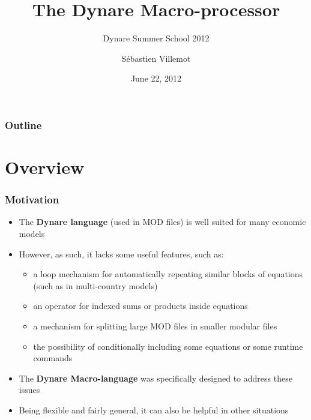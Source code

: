 \documentclass{beamer}
\title{The Dynare Macro-processor}
\subtitle{Dynare Summer School 2012}
\author{Sébastien Villemot}
\institute{CEPREMAP}
\date{June 22, 2012}
\begin{document}
\begin{frame}
  \titlepage
\end{frame}

\begin{frame}
  \frametitle{Outline}
  \tableofcontents
\end{frame}

\section{Overview}

\begin{frame}
  \frametitle{Motivation}
  \begin{itemize}
  \item The \textbf{Dynare language} (used in MOD files) is well suited for many economic models
  \item However, as such, it lacks some useful features, such as:
    \begin{itemize}
    \item a loop mechanism for automatically repeating similar blocks of equations (such as in multi-country models)
    \item an operator for indexed sums or products inside equations
    \item a mechanism for splitting large MOD files in smaller modular files
    \item the possibility of conditionally including some equations or some runtime commands
  \end{itemize}
  \item The \textbf{Dynare Macro-language} was specifically designed to address these issues
  \item Being flexible and fairly general, it can also be helpful in other situations
  \end{itemize}
\end{frame}
\end{document}
